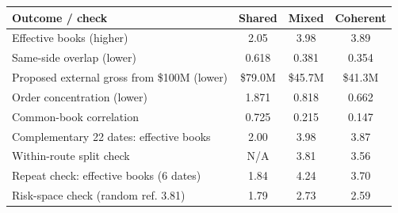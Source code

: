 \footnotesize
\begin{tabular*}{\linewidth}{@{\extracolsep{\fill}}lccc}
\toprule
Outcome / check & Shared & Mixed & Coherent \\
\midrule\addlinespace[2.5pt]
Effective books (higher) & 2.05 & 3.98 & 3.89 \\
Same-side overlap (lower) & 0.618 & 0.381 & 0.354 \\
Proposed external gross from \$100M (lower) & \$79.0M & \$45.7M & \$41.3M \\
Order concentration (lower) & 1.871 & 0.818 & 0.662 \\
Common-book correlation & 0.725 & 0.215 & 0.147 \\
Complementary 22 dates: effective books & 2.00 & 3.98 & 3.87 \\
Within-route split check & N/A & 3.81 & 3.56 \\
Repeat check: effective books (6 dates) & 1.84 & 4.24 & 3.70 \\
Risk-space check (random ref. 3.81) & 1.79 & 2.73 & 2.59 \\
\bottomrule
\end{tabular*}

